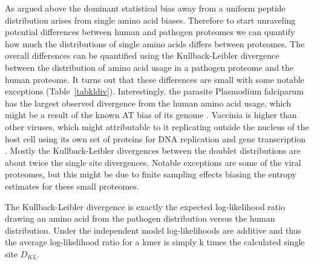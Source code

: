 \documentclass[superscriptaddress,twocolumn,pre]{revtex4}
\newcommand{\<}{\langle}
\renewcommand{\>}{\rangle}
\begin{document}
As argued above the dominant statistical bias away from a uniform peptide distribution arises from single amino acid biases. Therefore to start unraveling potential differences between human and pathogen proteomes we can quantify how much the distributions of single amino acids differs between proteomes. The overall differences can be quantified using the Kullback-Leibler divergence between the distribution of amino acid usage in a pathogen proteome and the human proteome. It turns out that these differences are small with some notable exceptions (Table~\ref{tabkldiv}). Interestingly, the parasite Plasmodium falciparum has the largest observed divergence from the human amino acid usage, which might be a result of the known AT bias of its genome \cite{Hamilton2017}. Vaccinia is higher than other viruses, which might attributable to it replicating outside the nucleus of the host cell using its own set of proteins for DNA replication and gene transcription \cite{Tolonen2001}. Mostly the Kullback-Leibler divergences between the doublet distributions are about twice the single site divergences. Notable exceptions are some of the viral proteomes, but this might be due to finite sampling effects biasing the entropy estimates for these small proteomes.

The Kullback-Leibler divergence is exactly the expected log-likelihood ratio drawing an amino acid from the pathogen distribution versus the human distribution. Under the independent model log-likelihoods are additive and thus the average log-likelihood ratio for a kmer is simply k times the calculated single site $D_{KL}$.
\end{document}
